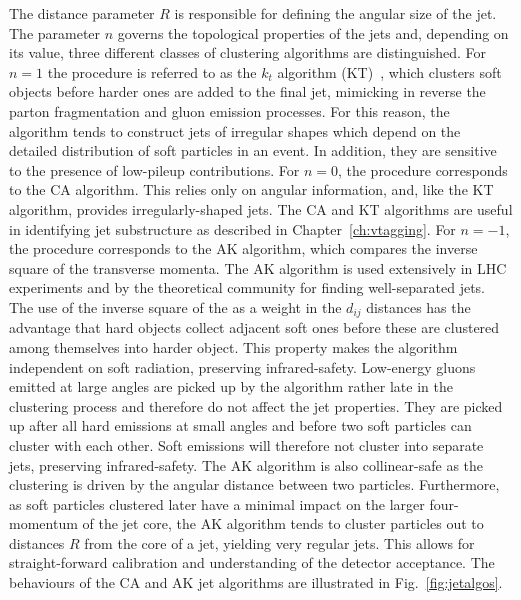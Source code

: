 The distance parameter $R$ is responsible for defining the angular size of the jet. The parameter $n$ governs the topological properties of the jets and, depending on its value, three different classes of clustering algorithms are distinguished. For $n = 1$ the procedure is referred to as the $k_t$ algorithm (KT)~\cite{Cacciari:2008gp}, which clusters soft objects before harder ones are added to the final jet, mimicking in reverse the parton fragmentation and gluon emission processes. For this reason, the algorithm tends to construct jets of irregular shapes which depend on the detailed distribution of soft particles in an event.
In addition, they are sensitive to the presence of low-\pt pileup contributions.
For $n = 0$, the procedure corresponds to the CA algorithm. This relies only on angular information, and, like the KT algorithm, provides irregularly-shaped jets. The CA and KT algorithms are useful in identifying jet substructure as described in Chapter~\ref{ch:vtagging}.
For $n = -1$, the procedure corresponds to the AK algorithm, which compares the inverse square of the transverse momenta.
The AK algorithm is used extensively in LHC experiments and by the theoretical community for finding well-separated jets. The use of the inverse square of the \pt as a weight in the $d_{ij}$ distances has the advantage that hard objects collect adjacent soft ones before these are clustered among themselves into harder object. %
This property makes the algorithm independent on soft radiation, preserving infrared-safety. Low-energy gluons emitted at large angles are picked up by the algorithm rather late in the clustering process and therefore do not affect the jet properties. They are picked up after all hard emissions at small angles and before two soft particles can cluster with each other. Soft emissions will therefore not cluster into separate jets, preserving infrared-safety. The AK algorithm is also collinear-safe as the clustering is driven by the angular distance between two particles. Furthermore, as soft particles clustered later have a minimal impact on the larger four-momentum of the jet core, the AK algorithm tends to cluster particles out to distances $R$ from the core of a jet, yielding very regular jets. This allows for straight-forward calibration and understanding of the detector acceptance. The behaviours of the CA and AK jet algorithms are illustrated in Fig.~\ref{fig:jetalgos}. 
